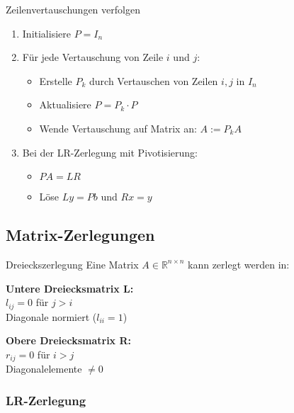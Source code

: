 \begin{KR}{Zeilenvertauschungen verfolgen}
\begin{enumerate}
    \item Initialisiere $P = I_n$
    \item Für jede Vertauschung von Zeile $i$ und $j$:
    \begin{itemize}
        \item Erstelle $P_k$ durch Vertauschen von Zeilen $i,j$ in $I_n$
        \item Aktualisiere $P = P_k \cdot P$
        \item Wende Vertauschung auf Matrix an: $A := P_kA$
    \end{itemize}
    \item Bei der LR-Zerlegung mit Pivotisierung:
    \begin{itemize}
        \item $PA = LR$ 
        \item Löse $Ly = Pb$ und $Rx = y$
    \end{itemize}
\end{enumerate}
\end{KR}

\subsection{Matrix-Zerlegungen}

\begin{definition}{Dreieckszerlegung}
Eine Matrix $A \in \mathbb{R}^{n\times n}$ kann zerlegt werden in:
\vspace{1mm}\\
\begin{minipage}[t]{0.5\textwidth}
    \textbf{Untere Dreiecksmatrix L:}\\
    $l_{ij} = 0$ für $j > i$\\
    Diagonale normiert ($l_{ii}=1$)
\end{minipage}
\hspace{3mm}
\begin{minipage}[t]{0.45\textwidth}
    \textbf{Obere Dreiecksmatrix R:}\\
    $r_{ij} = 0$ für $i > j$\\
    Diagonalelemente $\neq 0$
\end{minipage}
\end{definition}


\subsubsection{LR-Zerlegung}

